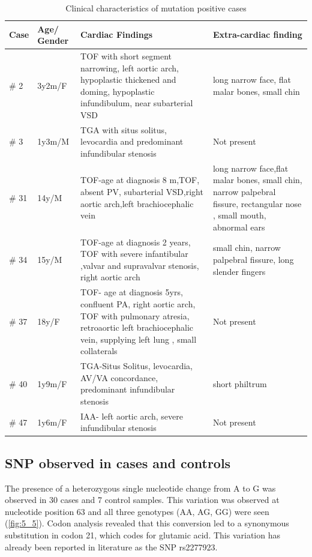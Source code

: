 \begin{refsection}
\begin{landscape}
\begin{table}[!tb]
\centering
\caption{Clinical characteristics of mutation positive cases}
\label{tab:5_6}
\begin{tabular}{ p{0.75in} p{1in} p{3in} p{3in} }
\toprule
	\textbf{Case} & \textbf{Age/ Gender}  & \textbf{Cardiac Findings} & \textbf{Extra-cardiac finding} \\ \toprule
	\# 2 & 3y2m/F & TOF with short segment narrowing, left aortic arch, hypoplastic thickened and doming, hypoplastic infundibulum, near subarterial VSD & long narrow face, flat malar bones, small chin \\ \midrule
	\# 3 & 1y3m/M & TGA with situs solitus, levocardia and predominant infundibular stenosis & Not present \\ \midrule
	\# 31 & 14y/M & TOF-age at diagnosis 8 m,TOF, absent PV, subarterial VSD,right aortic arch,left brachiocephalic vein & long narrow face,flat malar bones, small chin, narrow palpebral fissure, rectangular nose , small mouth, abnormal ears \\ \midrule
	\# 34 & 15y/M & TOF-age at diagnosis 2 years, TOF with severe infantibular ,valvar and supravalvar stenosis, right aortic arch & small chin, narrow palpebral fissure, long slender fingers \\ \midrule
	\# 37 & 18y/F & TOF- age at diagnosis 5yrs, confluent PA, right aortic arch, TOF with pulmonary atresia, retroaortic left brachiocephalic vein, supplying left lung , small collaterals & Not present \\ \midrule
	\# 40 & 1y9m/F & TGA-Situs Solitus, levocardia, AV/VA concordance, predominant infundibular stenosis & short philtrum \\ \midrule
	\# 47 & 1y6m/F & IAA- left aortic arch, severe infundibular stenosis & Not present \\ \bottomrule
\end{tabular}
\end{table}
\end{landscape}



\subsection{SNP observed in cases and controls}

The presence of a heterozygous single nucleotide change from A to G was observed in 30 cases and 7 control samples. This variation was observed at nucleotide position 63 and all three genotypes (AA, AG, GG) were seen (\cref{fig:5_5}). Codon analysis revealed that this conversion led to a synonymous substitution in codon 21, which codes for glutamic acid. This variation has already been reported in literature as the SNP rs2277923. 


\end{refsection}
